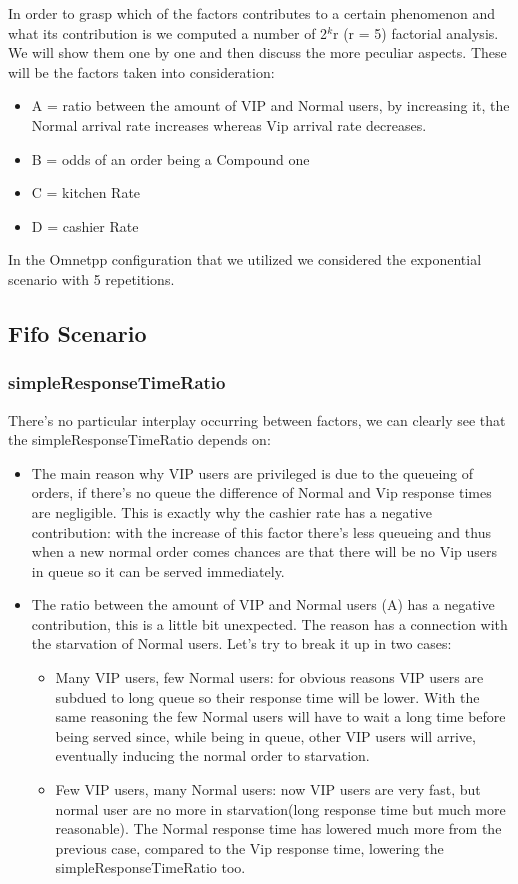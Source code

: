 In order to grasp which of the factors contributes to a certain phenomenon and what its contribution is we computed a number of 2$^k$r (r = 5) factorial analysis. We will show them one by one and then discuss the more peculiar aspects. These will be the factors taken into consideration: 
  \begin{itemize}
    \item A = ratio between the amount of VIP and Normal users, by increasing it, the Normal arrival rate increases whereas Vip arrival rate decreases.
    \item B = odds of an order being a Compound one
    \item C = kitchen Rate
    \item D = cashier Rate
  \end{itemize}
In the Omnetpp configuration that we utilized we considered the exponential scenario with 5 repetitions.

\subsection{Fifo Scenario}

\subsubsection{simpleResponseTimeRatio}


 
There's no particular interplay occurring between factors, we can clearly see that the simpleResponseTimeRatio depends on:
\begin{itemize}
    \item The main reason why VIP users are privileged is due to the queueing of orders, if there's no queue the difference of Normal and Vip response times are negligible. This is exactly why the cashier rate has a negative contribution: with the increase of this factor there's less queueing and thus when a new normal order comes chances are that there will be no Vip users in queue so it can be served immediately.
  \item The ratio between the amount of VIP and Normal users (A) has a negative contribution, this is a little bit unexpected. The reason has a connection with the starvation of Normal users. Let's try to break it up in two cases: 
  \begin{itemize}
    \item Many VIP users, few Normal users: for obvious reasons VIP users are subdued to long queue so their response time will be lower. With the same reasoning the few Normal users will have to wait a long time before being served since, while being in queue, other VIP users will arrive, eventually inducing the normal order to starvation.
    \item Few VIP users, many Normal users: now VIP users are very fast, but normal user are no more in starvation(long response time but much more reasonable). The Normal response time has lowered much more from the previous case, compared to the Vip response time, lowering the simpleResponseTimeRatio too.
    \end{itemize}
\end{itemize}

